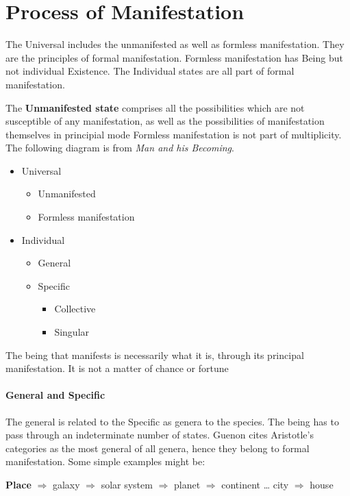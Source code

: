 \section{Process of Manifestation}

The Universal includes the unmanifested as well as formless manifestation. They are the principles of formal manifestation. Formless manifestation has Being but not individual Existence. The Individual states are all part of formal manifestation.

The \textbf{Unmanifested state} comprises all the possibilities which are not susceptible of any manifestation, as well as the possibilities of manifestation themselves in principial mode Formless manifestation is not part of multiplicity. The following diagram is from \emph{Man and his Becoming}.

\begin{itemize}
\item Universal 

\begin{itemize}
\item Unmanifested 
\item Formless manifestation 
\end{itemize}
\item Individual 

\begin{itemize}
\item General 
\item Specific 

\begin{itemize}
\item Collective 
\item Singular 
\end{itemize}
\end{itemize}
\end{itemize}
The being that manifests is necessarily what it is, through its principal manifestation. It is not a matter of chance or fortune

\paragraph{General and Specific}
The general is related to the Specific as genera to the species. The being has to pass through an indeterminate number of states. Guenon cites Aristotle's categories as the most general of all genera, hence they belong to formal manifestation. Some simple examples might be:

\textbf{Place} $\Rightarrow $ galaxy $\Rightarrow $ solar system $\Rightarrow $ planet $\Rightarrow $ continent … city $\Rightarrow $ house

